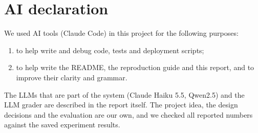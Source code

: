 \section*{AI declaration}

We used AI tools (Claude Code) in this project for the following purposes:
\begin{enumerate}
  \item to help write and debug code, tests and deployment scripts;
  \item to help write the README, the reproduction guide and this report, and to improve their
        clarity and grammar.
\end{enumerate}
The LLMs that are part of the system (Claude Haiku 5.5, Qwen2.5) and the LLM grader are described in
the report itself. The project idea, the design decisions and the evaluation are our own, and we
checked all reported numbers against the saved experiment results.
